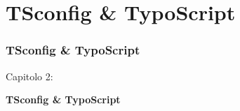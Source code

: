 %

\section{TSconfig \& TypoScript}
\begin{frame}[fragile]
	\frametitle{TSconfig \& TypoScript}

	\begin{center}\huge{Capitolo 2:}\end{center}
	\begin{center}\huge{\color{typo3darkgrey}\textbf{TSconfig \& TypoScript}}\end{center}

\end{frame}



